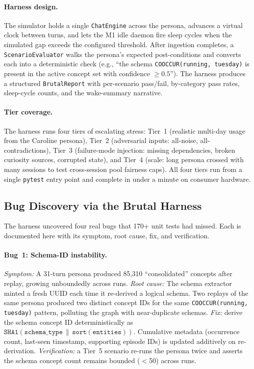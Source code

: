 \documentclass[11pt,twocolumn]{article}
\begin{document}
\paragraph{Harness design.} The simulator holds a single \texttt{ChatEngine} across the persona, advances a virtual clock between turns, and lets the M1 idle daemon fire sleep cycles when the simulated gap exceeds the configured threshold. After ingestion completes, a \texttt{ScenarioEvaluator} walks the persona's expected post-conditions and converts each into a deterministic check (e.g., ``the schema \texttt{COOCCUR(running, tuesday)} is present in the active concept set with confidence $\geq 0.5$''). The harness produces a structured \texttt{BrutalReport} with per-scenario pass/fail, by-category pass rates, sleep-cycle counts, and the wake-summary narrative.

\paragraph{Tier coverage.} The harness runs four tiers of escalating stress: Tier~1 (realistic multi-day usage from the Caroline persona), Tier~2 (adversarial inputs: all-noise, all-contradictions), Tier~3 (failure-mode injection: missing dependencies, broken curiosity sources, corrupted state), and Tier~4 (scale: long persona crossed with many sessions to test cross-session pool fairness caps). All four tiers run from a single \texttt{pytest} entry point and complete in under a minute on consumer hardware.

\subsection{Bug Discovery via the Brutal Harness}

The harness uncovered four real bugs that 170+ unit tests had missed. Each is documented here with its symptom, root cause, fix, and verification.

\paragraph{Bug~1: Schema-ID instability.} \emph{Symptom:} A 31-turn persona produced 85{,}310 ``consolidated'' concepts after replay, growing unboundedly across runs. \emph{Root cause:} The schema extractor minted a fresh UUID each time it re-derived a logical schema. Two replays of the same persona produced two distinct concept IDs for the same \texttt{COOCCUR(running, tuesday)} pattern, polluting the graph with near-duplicate schemas. \emph{Fix:} derive the schema concept ID deterministically as \(\texttt{SHA1}(\texttt{schema\_type} \,\|\, \texttt{sort}(\texttt{entities}))\). Cumulative metadata (occurrence count, last-seen timestamp, supporting episode IDs) is updated additively on re-derivation. \emph{Verification:} a Tier~5 scenario re-runs the persona twice and asserts the schema concept count remains bounded ($<$50) across runs.
\end{document}
